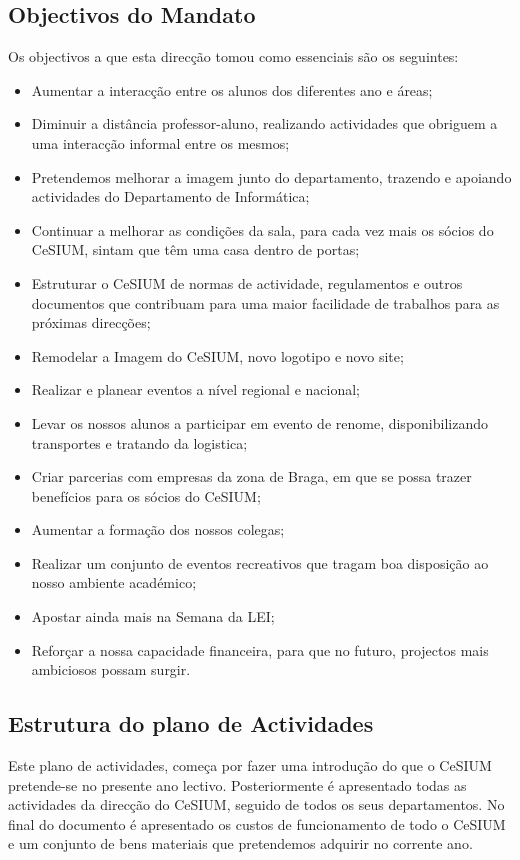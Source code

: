 \subsection{Objectivos do Mandato}
Os objectivos a que esta direcção tomou como essenciais são os seguintes:
\begin{itemize}
\item Aumentar a interacção entre os alunos dos diferentes ano e áreas;
\item Diminuir a distância professor-aluno, realizando actividades que obriguem a uma interacção informal entre os mesmos;
\item Pretendemos melhorar a imagem junto do departamento, trazendo e apoiando actividades do Departamento de Informática;
\item Continuar a melhorar as condições da sala, para cada vez mais os sócios do CeSIUM, sintam que têm uma casa dentro de portas;
\item Estruturar o CeSIUM de normas de actividade, regulamentos e outros documentos que contribuam para uma maior facilidade de trabalhos para as próximas direcções;
\item Remodelar a Imagem do CeSIUM, novo logotipo e novo site;
\item Realizar e planear eventos a nível regional e nacional;
\item Levar os nossos alunos a participar em evento de renome, disponibilizando transportes e tratando da logistica;
\item Criar parcerias com empresas da zona de Braga, em que se possa trazer benefícios para os sócios do CeSIUM;
\item Aumentar a formação dos nossos colegas;
\item Realizar um conjunto de eventos recreativos que tragam boa disposição ao nosso ambiente académico;
\item Apostar ainda mais na Semana da LEI;
\item Reforçar a nossa capacidade financeira, para que no futuro, projectos mais ambiciosos possam surgir.
\end{itemize}

\subsection{Estrutura do plano de Actividades}
\indent Este plano de actividades, começa por fazer uma introdução do que o CeSIUM pretende-se no presente ano lectivo. Posteriormente é apresentado todas as actividades da direcção do CeSIUM, seguido de todos os seus departamentos. No final do documento é apresentado os custos de funcionamento de todo o CeSIUM e um conjunto de bens materiais que pretendemos adquirir no corrente ano.

\newpage
